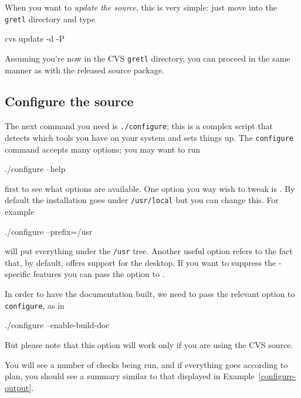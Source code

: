 When you want to \textit{update the source}, this is very simple: just move into
the \texttt{gretl} directory and type
\begin{code}
cvs update -d -P
\end{code}

Assuming you're now in the CVS \texttt{gretl} directory, you can
proceed in the same manner as with the released source package.


\subsection{Configure the source}
          
The next command you need is \texttt{./configure}; this is a complex
script that detects which tools you have on your system and sets
things up. The \texttt{configure} command accepts many
options; you may want to run 
\begin{code}
./configure --help
\end{code}
first to see what options are available. One option you way wish to
tweak is .  By default the installation goes under
\verb+/usr/local+ but you can change this.  For example
\begin{code}
./configure --prefix=/usr
\end{code}
will put everything under the \verb+/usr+ tree.  Another useful option
refers to the fact that, by default,  offers support for
the  desktop.  If you want to suppress the
-specific features you can pass the option
 to .

In order to have the documentation built, we need to pass the relevant
option to \texttt{configure}, as in
\begin{code}
./configure --enable-build-doc
\end{code}
But please note that this option will work only if you are using
the CVS source.

You will see a number of checks being run, and if everything goes
according to plan, you should see a summary similar to that displayed
in Example~\ref{configure-output}.

